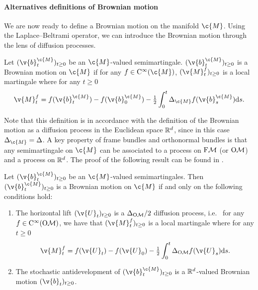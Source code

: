\paragraph{Alternatives definitions of Brownian motion}

We are now ready to define a Brownian motion on the manifold \(\c{M}\).
Using the Laplace--Beltrami operator, we can introduce the Brownian motion through the lens of diffusion processes.

\begin{definition}
	Let \((\v{b}_t^\c{M})_{t \geq 0}\) be an \(\c{M}\)-valued semimartingale.
	\((\v{b}_t^\c{M})_{t \geq 0}\) is a Brownian motion on \(\c{M}\) if for any
	\(f \in \mathrm{C}^\infty(\c{M})\), \((\v{M}_t^f)_{t \geq 0}\) is a local martingale where
	for any \(t \geq 0\)
	\begin{equation}
		{\v{M}_t^f = f(\v{b}_t^\c{M}) - f(\v{b}_0^\c{M}) - \tfrac{1}{2}\int_0^t \Delta_{\c{M}}f(\v{b}_s^\c{M}) \mathrm{d} s  .}
	\end{equation}
\end{definition}

Note that this definition is in accordance with the definition of the Brownian motion as a diffusion process in the Euclidean space \(\mathbb{R}^d\), since in this case \(\Delta_{\c{M}} = \Delta\).
A key property of frame bundles and orthonormal bundles is that any semimartingale on \(\c{M}\) can be associated to a process on \(\mathrm{F}\mathcal{M}\) (or \(\mathrm{O}\mathcal{M}\)) and a process on \(\mathbb{R}^d\).
The proof of the following result can be found in \textcite[Propositions 3.2.1 and 3.2.2]{hsu2002stochastic}.

\begin{proposition}
	\label{prop:intrinsic_brownian}
	Let \((\v{b}_t^\c{M})_{t \geq 0}\) be an \(\c{M}\)-valued semimartingales.
	Then \((\v{b}_t^\c{M})_{t \geq 0}\) is a Brownian motion on \(\c{M}\) if and only on the following conditions hold: \begin{enumerate}[label=\alph*)] \item The horizontal lift \((\v{U}_t)_{t \geq 0}\) is a \(\Delta_{\mathrm{O}\mathcal{M}}/2\) diffusion process, i.e. \ for any \(f \in \mathrm{C}^\infty(\mathrm{O}\mathcal{M})\), we have that \((\v{M}_t^f)_{t \geq 0}\) is a local martingale where for any \(t \geq 0\) \begin{equation} {\v{M}_t^f = f(\v{U}_t) - f(\v{U}_0) - \tfrac{1}{2}\int_0^t \Delta_{\OM}f(\v{U}_s) \mathrm{d} s .
			      }
		      \end{equation}
		\item The stochastic antidevelopment of \((\v{b}_t^\c{M})_{t \geq 0}\) is a
		      \(\mathbb{R}^d\)-valued Brownian motion \((\v{b}_t)_{t \geq 0}\).
	\end{enumerate}
\end{proposition}

